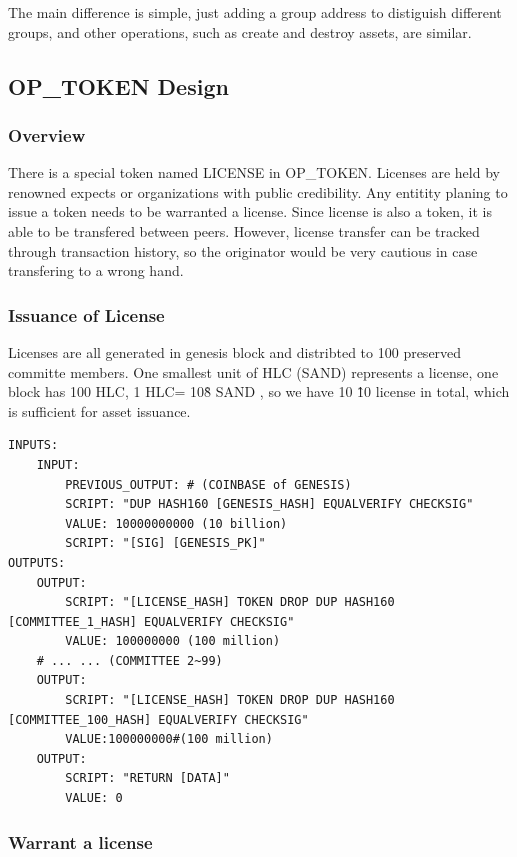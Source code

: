 \documentclass[a4paper,11pt]{article}
\begin{document}
The main difference is simple, just adding a group address to distiguish different groups, and other operations, such as create and destroy assets, are similar.


\subsection{OP\_TOKEN Design}

\subsubsection{Overview}

There is a special token named LICENSE in OP\_TOKEN. Licenses are held by renowned expects or organizations with public credibility. Any entitity planing to issue a token needs to be warranted a license. Since license is also a token, it is able to be transfered between peers. However, license transfer can be tracked through transaction history, so the originator would be very cautious in case transfering to a wrong hand.

\subsubsection{Issuance of License}

Licenses are all generated in genesis block and distribted to 100 preserved committe members. One smallest unit of HLC (SAND) represents a license,  one block has 100 HLC,  1 HLC= 10\^8 SAND , so we have 10 \^10 license in total, which is sufficient for asset issuance.


\lstset{basicstyle=\tiny,style=myListStyle}
\begin{lstlisting}
INPUTS:
	INPUT:
		PREVIOUS_OUTPUT: # (COINBASE of GENESIS)
		SCRIPT: "DUP HASH160 [GENESIS_HASH] EQUALVERIFY CHECKSIG"
		VALUE: 10000000000 (10 billion)
		SCRIPT: "[SIG] [GENESIS_PK]"
OUTPUTS:
	OUTPUT:
		SCRIPT: "[LICENSE_HASH] TOKEN DROP DUP HASH160 [COMMITTEE_1_HASH] EQUALVERIFY CHECKSIG"
		VALUE: 100000000 (100 million)
	# ... ... (COMMITTEE 2~99)
	OUTPUT:
		SCRIPT: "[LICENSE_HASH] TOKEN DROP DUP HASH160 [COMMITTEE_100_HASH] EQUALVERIFY CHECKSIG"
		VALUE:100000000#(100 million)
	OUTPUT:
		SCRIPT: "RETURN [DATA]" 
		VALUE: 0
\end{lstlisting}


\subsubsection{Warrant a license}
\end{document}
